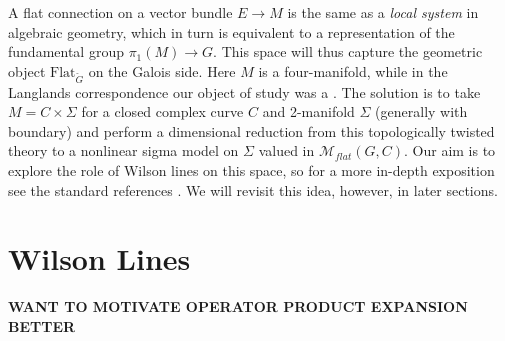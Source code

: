 	A flat connection on a vector bundle $E \to M$ is the same as a \emph{local system} in algebraic geometry, which in turn is equivalent to a representation of the fundamental group $\pi_1(M) \to G$.
	 This space will thus capture the geometric object $\mathrm{Flat}_{\check G}$ on the Galois side. Here $M$ is a four-manifold, while in the Langlands correspondence our object of study was a . The solution is to take $M = C \times \Sigma$ for a closed complex curve $C$ and 2-manifold $\Sigma$ (generally with boundary) and perform a dimensional reduction from this topologically twisted theory to a nonlinear sigma model on $\Sigma$ valued in $\mathcal M_{flat}(G, C)$.
	 Our aim is to explore the role of Wilson lines on this space, so for a more in-depth exposition see the standard references \cite{kapustin2006, kapustin2008}. We will revisit this idea, however, in later sections. 
	




\section{Wilson Lines} %
\label{sec:wilson_lines}

	\textbf{WANT TO MOTIVATE OPERATOR PRODUCT EXPANSION BETTER}

